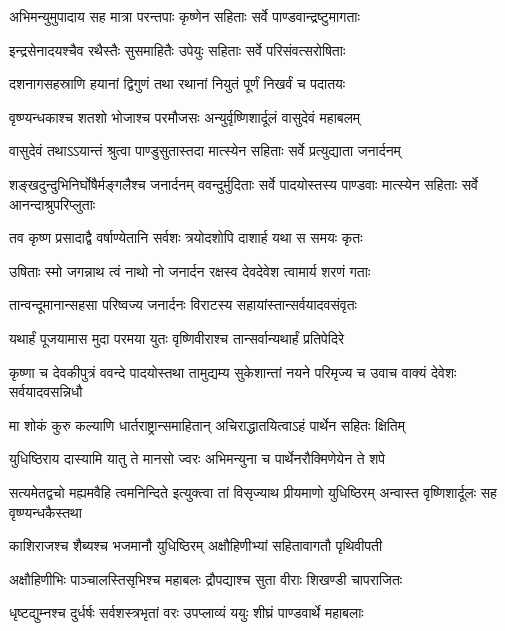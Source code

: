 \twolineshloka
{अभिमन्युमुपादाय सह मात्रा परन्तपाः}
{कृष्णेन सहिताः सर्वे पाण्डवान्द्रष्टुमागताः}


\twolineshloka
{इन्द्रसेनादयश्चैव रथैस्तैः सुसमाहितैः}
{उपेयुः सहिताः सर्वे परिसंवत्सरोषिताः}


\twolineshloka
{दशनागसहस्राणि हयानां द्विगुणं तथा}
{रथानां नियुतं पूर्णं निखर्वं च पदातयः}


\twolineshloka
{वृष्ण्यन्धकाश्च शतशो भोजाश्च परमौजसः}
{अन्युर्वृष्णिशार्दूलं वासुदेवं महाबलम्}


\twolineshloka
{वासुदेवं तथाऽऽयान्तं श्रुत्वा पाण्डुसुतास्तदा}
{मात्स्येन सहिताः सर्वे प्रत्युद्याता जनार्दनम्}


\threelineshloka
{शङ्खदुन्दुभिनिर्घोषैर्मङ्गलैश्च जनार्दनम्}
{ववन्दुर्मुदिताः सर्वे पादयोस्तस्य पाण्डवाः}
{मात्स्येन सहिताः सर्वे आनन्दाश्रुपरिप्लुताः}


\twolineshloka
{तव कृष्ण प्रसादाद्वै वर्षाण्येतानि सर्वशः}
{त्रयोदशोपि दाशार्ह यथा स समयः कृतः}


\twolineshloka
{उषिताः स्मो जगन्नाथ त्वं नाथो नो जनार्दन}
{रक्षस्व देवदेवेश त्वामार्य शरणं गताः}



\twolineshloka
{तान्वन्दूमानान्सहसा परिष्वज्य जनार्दनः}
{विराटस्य सहायांस्तान्सर्वयादवसंवृतः}


\twolineshloka
{यथार्हं पूजयामास मुदा परमया युतः}
{वृष्णिवीराश्च तान्सर्वान्यथार्हं प्रतिपेदिरे}


\threelineshloka
{कृष्णा च देवकीपुत्रं ववन्दे पादयोस्तथा}
{तामुद्यम्य सुकेशान्तां नयने परिमृज्य च}
{उवाच वाक्यं देवेशः सर्वयादवसन्निधौ}


\twolineshloka
{मा शोकं कुरु कल्याणि धार्तराष्ट्रान्समाहितान्}
{अचिराद्धातयित्वाऽहं पार्थेन सहितः क्षितिम्}


\twolineshloka
{युधिष्ठिराय दास्यामि यातु ते मानसो ज्वरः}
{अभिमन्युना च पार्थेनरौक्मिणेयेन ते शपे}


\threelineshloka
{सत्यमेतद्वचो मह्यमवैहि त्वमनिन्दिते}
{इत्युक्त्वा तां विसृज्याथ प्रीयमाणो युधिष्ठिरम्}
{अन्वास्त वृष्णिशार्दूलः सह वृष्ण्यन्धकैस्तथा}


\twolineshloka
{काशिराजश्च शैब्यश्च भजमानौ युधिष्ठिरम्}
{अक्षौहिणीभ्यां सहितावागतौ पृथिवीपती}


\twolineshloka
{अक्षौहिणीभिः पाञ्चालस्तिसृभिश्च महाबलः}
{द्रौपद्याश्च सुता वीराः शिखण्डी चापराजितः}


\twolineshloka
{धृष्टद्युम्नश्च दुर्धर्षः सर्वशस्त्रभृतां वरः}
{उपप्लाव्यं ययुः शीघ्रं पाण्डवार्थे महाबलाः}


